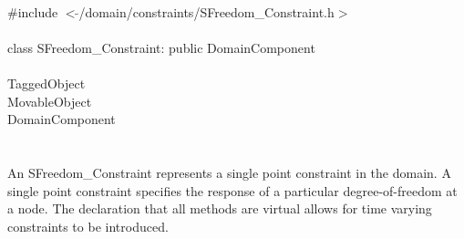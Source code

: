 
   \\
\indent \#include $<\tilde{ }$/domain/constraints/SFreedom\_Constraint.h$>$  \\

  \\
\indent class SFreedom\_Constraint: public DomainComponent \\

 \\
\indent TaggedObject \\
\indent MovableObject \\
\indent\indent DomainComponent \\
\indent\indent{} \\

  \\
\indent An SFreedom\_Constraint represents a single point constraint in the
domain. A single point constraint specifies the response of a particular
degree-of-freedom at a node. The declaration that all methods are
virtual allows for time varying constraints to be introduced. \\

